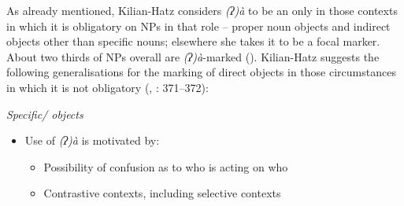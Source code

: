 \documentclass[output=paper]{LSP/langsci}
\begin{document}
As already mentioned, Kilian-Hatz considers \textit{(ʔ)à} to be an  only in those contexts in which it is obligatory on NPs in that role – \ie proper noun objects and indirect objects other than specific nouns; elsewhere she takes it to be a focal marker. About two thirds of  NPs overall are \textit{(ʔ)à}-marked (\citealt[376]{Kilian-Hatz2013Kxoe}). Kilian-Hatz suggests the following generalisations for the marking of direct objects in those circumstances in which it is not obligatory (\citealt[59–61]{Kilian-Hatz2008Grammar}, \citeyear{Kilian-Hatz2013Kxoe}: 371–372):

\textit{Specific/ objects}
\begin{itemize}

\item Use of \textit{(ʔ)à} is motivated by:
    \begin{itemize}
    \item Possibility of confusion as to who is acting on who
    \item Contrastive contexts, including selective contexts
    \end{itemize}

\end{itemize}


\end{document}
